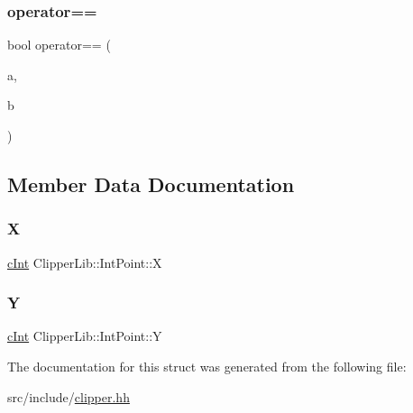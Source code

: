 \mbox{\label{struct_clipper_lib_1_1_int_point_a6afef09ee09723a387e3046287e2635b}} 
\subsubsection{\texorpdfstring{operator==}{operator==}}
{\footnotesize\ttfamily bool operator== (\begin{DoxyParamCaption}\item[{const \mbox{\hyperlink{struct_clipper_lib_1_1_int_point}{Int\+Point}} \&}]{a,  }\item[{const \mbox{\hyperlink{struct_clipper_lib_1_1_int_point}{Int\+Point}} \&}]{b }\end{DoxyParamCaption})\hspace{0.3cm}{\ttfamily [friend]}}



\subsection{Member Data Documentation}
\mbox{\label{struct_clipper_lib_1_1_int_point_a608d16d39c8762e6c3c0a688efb310b6}} 
\subsubsection{\texorpdfstring{X}{X}}
{\footnotesize\ttfamily \mbox{\hyperlink{namespace_clipper_lib_a7156730a24951629192d4831334bafaa}{c\+Int}} Clipper\+Lib\+::\+Int\+Point\+::X}

\mbox{\label{struct_clipper_lib_1_1_int_point_a8445d190cd9013bb34d49b5a8a240425}} 
\subsubsection{\texorpdfstring{Y}{Y}}
{\footnotesize\ttfamily \mbox{\hyperlink{namespace_clipper_lib_a7156730a24951629192d4831334bafaa}{c\+Int}} Clipper\+Lib\+::\+Int\+Point\+::Y}



The documentation for this struct was generated from the following file\+:\begin{DoxyCompactItemize}
\item 
src/include/\mbox{\hyperlink{clipper_8hh}{clipper.\+hh}}\end{DoxyCompactItemize}
